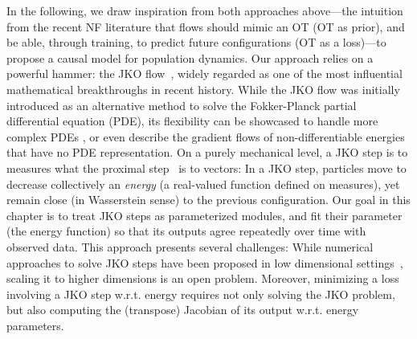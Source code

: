 In the following, we draw inspiration from both approaches above---the intuition from the recent \acrfull{NF} literature that flows should mimic an \acrlong{OT} (\acrshort{OT} as prior), and be able, through training, to predict future configurations (\acrshort{OT} as a loss)---to propose a causal model for population dynamics. Our approach relies on a powerful hammer: the \acrfull{JKO} flow~\citep{jordan1998variational}, widely regarded as one of the most influential mathematical breakthroughs in recent history. While the \acrshort{JKO} flow was initially introduced as an alternative method to solve the Fokker-Planck partial differential equation (PDE), its flexibility can be showcased to handle more complex PDEs \citep[\S4.7]{santambrogio2017euclidean}, or even describe the gradient flows of non-differentiable energies that have no PDE representation.
On a purely mechanical level, a \acrshort{JKO} step is to measures what the proximal step~\citep{combettes2011proximal} is to vectors: In a \acrshort{JKO} step, particles move to decrease collectively an {\em energy} (a real-valued function defined on measures), yet remain close (in Wasserstein sense) to the previous configuration. Our goal in this chapter is to treat \acrshort{JKO} steps as parameterized modules, and fit their parameter (the energy function) so that its outputs agree repeatedly over time with observed data. 
This approach presents several challenges: While numerical approaches to solve \acrshort{JKO} steps have been proposed in low dimensional settings~\citep{burger2010a, carrillo2021primal, peyre2015entropic,benamou2016augmented}, scaling it to higher dimensions is an open problem. Moreover, minimizing a loss involving a \acrshort{JKO} step w.r.t. energy requires not only solving the \acrshort{JKO} problem, but also computing the (transpose) Jacobian of its output w.r.t. energy parameters. \\


